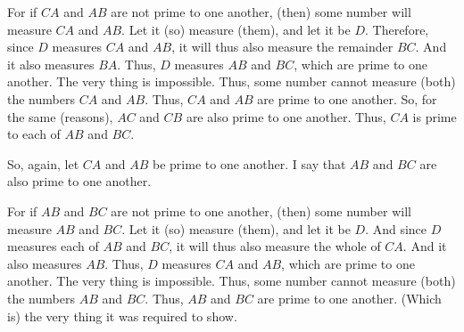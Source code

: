 \begin{Parallel}{}{}
{For if $CA$ and $AB$ are not prime to one another, (then) some number
will measure $CA$ and $AB$. Let it (so) measure (them), and let it be $D$.
Therefore, since $D$ measures $CA$ and $AB$, it will thus also measure the remainder
$BC$. And it also measures $BA$. Thus, $D$ measures $AB$ and $BC$, which are
prime to one another. The very thing is impossible. Thus, some number cannot measure (both) the numbers $CA$ and $AB$. Thus, $CA$ and $AB$ are prime to
one another. So, for the same (reasons), $AC$ and $CB$ are also prime to one another. Thus, $CA$ is prime to each of $AB$ and $BC$.

So, again, let $CA$ and $AB$  be prime to one another. I say that $AB$ and $BC$
are also prime to one another.

For if $AB$ and $BC$ are not prime to one another, (then) some number will measure $AB$ and $BC$. Let it (so) measure (them), and let it be $D$. And since
$D$ measures each of $AB$ and $BC$, it will thus also measure the whole
of $CA$. And it also measures $AB$. Thus, $D$ measures $CA$ and $AB$, which are
prime to one another. The very thing is impossible. Thus, some number
cannot measure (both) the numbers $AB$ and $BC$. Thus, $AB$ and $BC$ are prime
to one another. (Which is) the very thing it was required to show.}
\end{Parallel}

